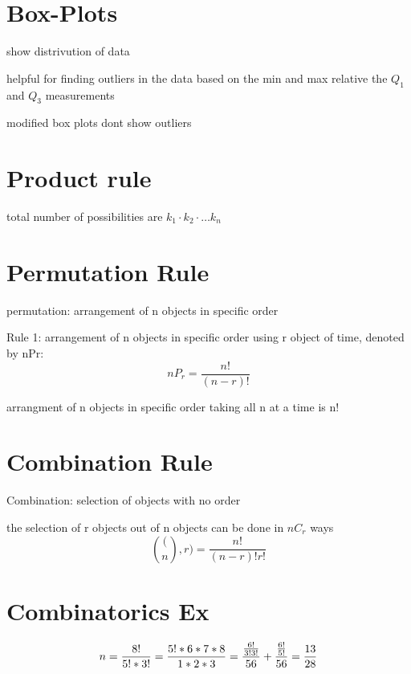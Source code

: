 \documentclass[11pt]{amsart}
\begin{document}
\section{Box-Plots}
\par show distrivution of data
\par helpful for finding outliers in the data based on the min and max relative
the $Q_1$ and $Q_3$ measurements
\par modified box plots dont show outliers
\section{Product rule}
\par total number of possibilities are $k_1 \cdot k_2 \cdot \dots k_n$
\section{Permutation Rule}
\par permutation: arrangement of n objects in specific order
\par Rule 1: arrangement of n objects in specific order using r object of
time, denoted by nPr:
\begin{equation}
  nP_r = \frac{n!}{(n-r)!}
\end{equation}
\par arrangment of n objects in specific order taking all n at a time is n!
\section{Combination Rule}
\par Combination: selection of objects with no order
\par the selection of r objects out of n objects can be done in $nC_r$ ways
\begin{equation}
  \binom(n, r) = \frac{n!}{(n-r)!r!}
\end{equation}
\section{Combinatorics Ex}
\begin{equation}
  n = \frac{8!}{5!*3!} \\
    = \frac{5!*6*7*8}{1*2*3} \\
    = \frac{ \frac{6!}{3!3!}}{56} + \frac{\frac{6!}{5!}}{56} \\
    = \frac{13}{28} \\
\end{equation}
\end{document}
